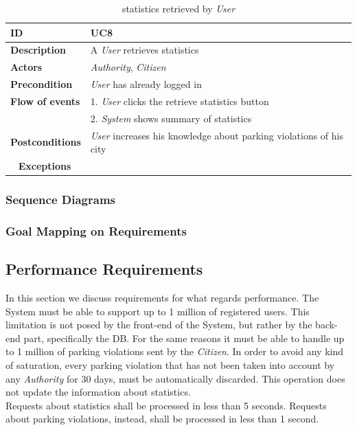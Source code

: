 \documentclass{article}
\begin{document}
\clearpage
\begin{table}
    \begin{center}
    \centering
\begin{tabular}{ | l | l |}
\hline
\textbf{ID} & UC8 \\
\hline
\textbf{Description} & A \textit{User} retrieves statistics  \\
\hline
\textbf{Actors} & \textit{Authority}, \textit{Citizen} \\
\hline
\textbf{Precondition} & \textit{User} has already logged in \\
\hline
\textbf{Flow of events} & 1. \textit{User} clicks the retrieve statistics button \\
                        & 2. \textit{System} shows summary of statistics \\
\hline
\textbf{Postconditions} & \textit{User} increases his knowledge about parking violations of his city  \\\
\hline
\textbf{Exceptions} & \\ 
\hline
\end{tabular}
\caption{statistics retrieved by \textit{User} }
\end{center}
\end{table}


\subsubsection{Sequence Diagrams}

\subsubsection{Goal Mapping on Requirements}

\subsection{Performance Requirements}
In this section we discuss requirements for what regards performance. The System must be able to support up to
1 million of registered users. This limitation is not posed by the front-end of the System, but rather by the 
back-end part, specifically the DB. For the same reasons it must be able to handle up to 1 million of parking violations 
sent by the \textit{Citizen}. In order to avoid any kind of saturation, every parking violation that has not been taken into account
 by any \textit{Authority} for 30 days, must be automatically discarded. This operation does not update the information about
 statistics.
 \\Requests about statistics shall be processed in less than 5 seconds. Requests about parking violations, instead, shall be processed 
 in less than 1 second.     
\end{document}
